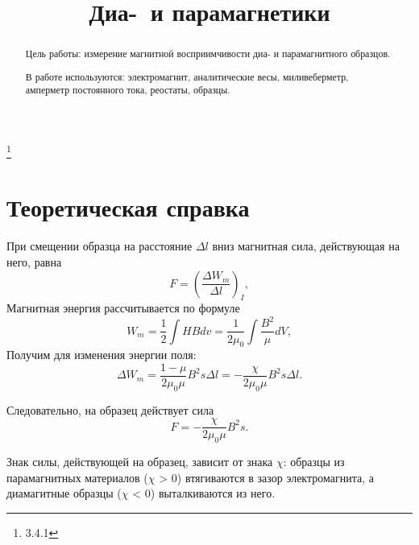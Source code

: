 


\title{Диа-~и парамагнетики}
\thanks{3.4.1}



\begin{abstract}
Цель работы: измерение магнитной восприимчивости диа- и парамагнитного образцов.

В работе используются: электромагнит, аналитические весы, миливеберметр, амперметр постоянного тока, реостаты, образцы.\\

\end{abstract}

\maketitle


\section{\label{sec:level1}Теоретическая справка}

При смещении образца на расстояние $\Delta{l}$ вниз магнитная сила, действующая на него, равна
\begin{equation}\label{1}
    F = \left(\frac{\Delta{W_m}}{\Delta{l}}\right)_I,
\end{equation}
Магнитная энергия рассчитывается по формуле
\begin{equation}\label{2}
    W_m = \frac{1}{2}\int HB dv = \frac{1}{2 \mu_0}\int \frac{B^2}{\mu}dV,
\end{equation} 
Получим для изменения энергии поля:
\begin{equation*}
    \Delta{}W_m = \frac{1-\mu}{2 \mu_0 \mu}B^2s\Delta{l} = -\frac{\chi}{2 \mu_0 \mu}B^2s\Delta{l}.
\end{equation*}

Следовательно, на образец действует сила
\begin{equation}\label{3}
    F = -\frac{\chi}{2 \mu_0 \mu}B^2s.
\end{equation}

Знак силы, действующей на образец, зависит от знака $\chi$: образцы из парамагнитных материалов ($\chi$ > 0) втягиваются в зазор электромагнита, а диамагитные образцы ($\chi$ < 0) выталкиваются из него. 

